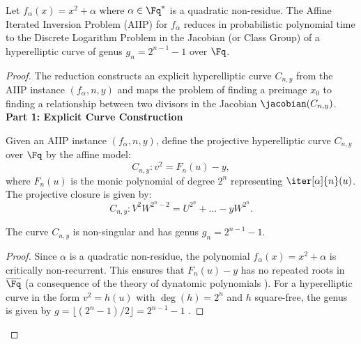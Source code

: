 \begin{theorem}\label{thm:aiip-hcdlp}
            Let \( f_\alpha(x) = x^2 + \alpha \) where \(\alpha \in \Fq^*\) is a quadratic non-residue. The Affine Iterated Inversion Problem (AIIP) for \( f_\alpha \) reduces in probabilistic polynomial time to the Discrete Logarithm Problem in the Jacobian (or Class Group) of a hyperelliptic curve of genus \( g_n = 2^{n-1} - 1 \) over \(\Fq\).
        \end{theorem}
        \begin{proof}
            The reduction constructs an explicit hyperelliptic curve \( C_{n,y} \) from the AIIP instance \((f_\alpha, n, y)\) and maps the problem of finding a preimage \(x_0\) to finding a relationship between two divisors in the Jacobian \(\jacobian(C_{n,y})\).
            \textbf{Part 1: Explicit Curve Construction}
                \begin{definition}
                    Given an AIIP instance \((f_\alpha, n, y)\), define the projective hyperelliptic curve \(C_{n,y}\) over \(\Fq\) by the affine model:
                    \begin{equation}\label{eq:curve-def}
                        C_{n,y}: v^2 = F_n(u) - y,
                    \end{equation}
                    where \(F_n(u)\) is the monic polynomial of degree \(2^n\) representing \(\iter[\alpha]{n}(u)\). The projective closure is given by:
                    \begin{equation}
                        C_{n,y}: V^2W^{2^n-2} = U^{2^n} + \dots - y W^{2^n}.
                    \end{equation}
                \end{definition}
                \begin{lemma}\label{lemma:genus}
                    The curve \(C_{n,y}\) is non-singular and has genus \(g_n = 2^{n-1} - 1\).
                \end{lemma}
                \begin{proof}
                    Since \(\alpha\) is a quadratic non-residue, the polynomial \(f_\alpha(x) = x^2 + \alpha\) is critically non-recurrent. This ensures that \(F_n(u) - y\) has no repeated roots in \(\overline{\Fq}\) (a consequence of the theory of dynatomic polynomials \cite[Chapter 4]{Silverman2007}). For a hyperelliptic curve in the form \(v^2 = h(u)\) with \(\deg(h) = 2^n\) and \(h\) square-free, the genus is given by \(g = \lfloor (2^n - 1)/2 \rfloor = 2^{n-1} - 1\) \cite[Proposition 7.4.24]{Cohen2010}.

\end{proof}
\end{proof}
